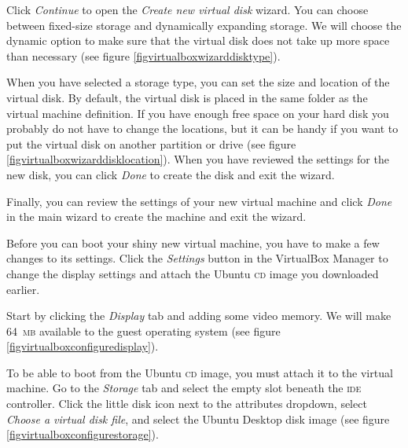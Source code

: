 \documentclass[final,ebook,10pt,twoside,openright]{memoir}
\begin{document}

Click \emph{Continue} to open the \emph{Create new virtual disk} wizard. You can choose between fixed-size storage and dynamically expanding storage. We will choose the dynamic option to make sure that the virtual disk does not take up more space than necessary (see figure \ref{figvirtualboxwizarddisktype}).


When you have selected a storage type, you can set the size and location of the virtual disk. By default, the virtual disk is placed in the same folder as the virtual machine definition. If you have enough free space on your hard disk you probably do not have to change the locations, but it can be handy if you want to put the virtual disk on another partition or drive (see figure \ref{figvirtualboxwizarddisklocation}). When you have reviewed the settings for the new disk, you can click \emph{Done} to create the disk and exit the wizard.


Finally, you can review the settings of your new virtual machine and click \emph{Done} in the main wizard to create the machine and exit the wizard.

Before you can boot your shiny new virtual machine, you have to make a few changes to its settings. Click the \emph{Settings} button in the VirtualBox Manager to change the display settings and attach the Ubuntu \textsc{cd} image you downloaded earlier.

Start by clicking the \emph{Display} tab and adding some video memory. We will make 64~\textsc{mb} available to the guest operating system (see figure \ref{figvirtualboxconfiguredisplay}).


To be able to boot from the Ubuntu \textsc{cd} image, you must attach it to the virtual machine. Go to the \emph{Storage} tab and select the empty slot beneath the \textsc{ide} controller. Click the little disk icon next to the attributes dropdown, select \emph{Choose a virtual  disk file}, and select the Ubuntu Desktop disk image (see figure \ref{figvirtualboxconfigurestorage}).
\end{document}
